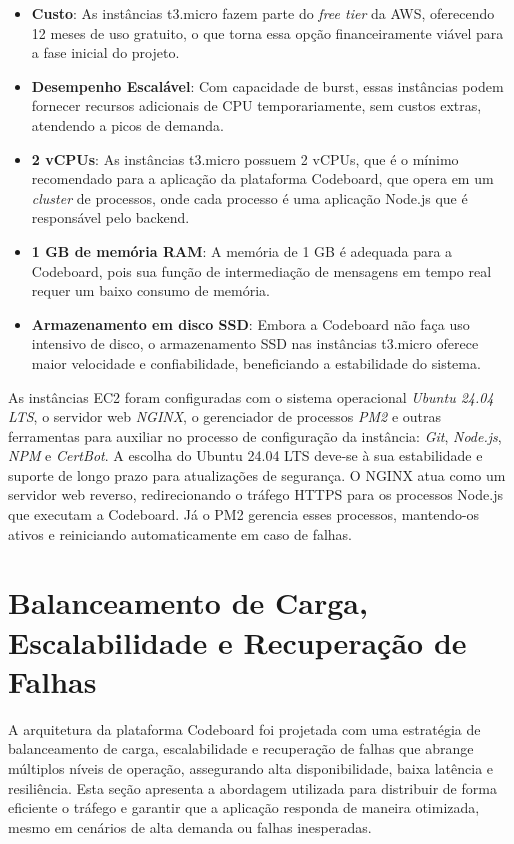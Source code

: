 \begin{itemize}
    \item \textbf{Custo}: As instâncias t3.micro fazem parte do \emph{free tier} da AWS, oferecendo 12 meses de uso gratuito, o que torna essa opção financeiramente viável para a fase inicial do projeto.
    \item \textbf{Desempenho Escalável}: Com capacidade de burst, essas instâncias podem fornecer recursos adicionais de CPU temporariamente, sem custos extras, atendendo a picos de demanda.
    \item \textbf{2 vCPUs}: As instâncias t3.micro possuem 2 vCPUs, que é o mínimo recomendado para a aplicação da plataforma Codeboard, que opera em um \emph{cluster} de processos, onde cada processo é uma aplicação Node.js que é responsável pelo backend.
    \item \textbf{1 GB de memória RAM}: A memória de 1 GB é adequada para a Codeboard, pois sua função de intermediação de mensagens em tempo real requer um baixo consumo de memória.
    \item \textbf{Armazenamento em disco SSD}: Embora a Codeboard não faça uso intensivo de disco, o armazenamento SSD nas instâncias t3.micro oferece maior velocidade e confiabilidade, beneficiando a estabilidade do sistema.
\end{itemize}

As instâncias EC2 foram configuradas com o sistema operacional \emph{Ubuntu 24.04 LTS}, o servidor web \emph{NGINX}, o gerenciador de processos \emph{PM2} e outras ferramentas para auxiliar no processo de configuração da instância: \emph{Git}, \emph{Node.js}, \emph{NPM} e \emph{CertBot}. A escolha do Ubuntu 24.04 LTS deve-se à sua estabilidade e suporte de longo prazo para atualizações de segurança. O NGINX atua como um servidor web reverso, redirecionando o tráfego HTTPS para os processos Node.js que executam a Codeboard. Já o PM2 gerencia esses processos, mantendo-os ativos e reiniciando automaticamente em caso de falhas.

\section{Balanceamento de Carga, Escalabilidade e Recuperação de Falhas}

A arquitetura da plataforma Codeboard foi projetada com uma estratégia de balanceamento de carga, escalabilidade e recuperação de falhas que abrange múltiplos níveis de operação, assegurando alta disponibilidade, baixa latência e resiliência. Esta seção apresenta a abordagem utilizada para distribuir de forma eficiente o tráfego e garantir que a aplicação responda de maneira otimizada, mesmo em cenários de alta demanda ou falhas inesperadas.

